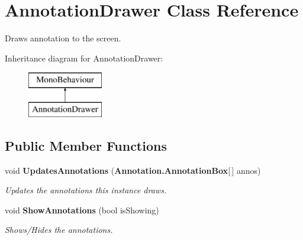 \section{Annotation\+Drawer Class Reference}
\label{class_annotation_drawer}


Draws annotation to the screen.  


Inheritance diagram for Annotation\+Drawer\+:\begin{figure}[H]
\begin{center}
\leavevmode
\includegraphics[height=2.000000cm]{class_annotation_drawer}
\end{center}
\end{figure}
\subsection*{Public Member Functions}
\begin{DoxyCompactItemize}
\item 
void {\bf Updates\+Annotations} ({\bf Annotation.\+Annotation\+Box}[$\,$] annos)
\begin{DoxyCompactList}\small\item\em Updates the annotations this instance draws. \end{DoxyCompactList}\item 
void {\bf Show\+Annotations} (bool is\+Showing)
\begin{DoxyCompactList}\small\item\em Shows/\+Hides the annotations. \end{DoxyCompactList}\end{DoxyCompactItemize}
